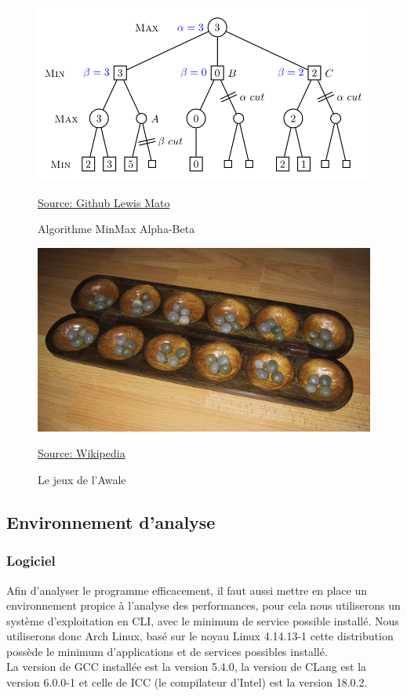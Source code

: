 \documentclass[
 aip,
 jmp,
 amsmath,amssymb,
 reprint
]{revtex4-1}
\begin{document}
\begin{figure}[H]
  \includegraphics[width=\linewidth, keepaspectratio=true]{alpha_beta.png}
  \centering
  \caption{Algorithme MinMax Alpha-Beta\label{Fig:alpha_beta}}{\href{https://github.com/LewisMatos/MiniMaxTicTacToe}{Source: Github Lewis Mato}}
\end{figure}
\begin{figure}[H]
  \includegraphics[width=\linewidth, keepaspectratio=true]{Awale.jpg}
  \centering
  \caption{Le jeux de l'Awale\label{Fig:awale}}{\href{https://fr.wikipedia.org/wiki/Awale}{Source: Wikipedia}}
\end{figure}

\subsection{Environnement d'analyse}
\subsubsection{Logiciel}
Afin d'analyser le programme efficacement, il faut aussi mettre en place un environnement propice à l'analyse des performances, pour cela nous utiliserons un système d'exploitation en CLI, avec le minimum de service possible installé. Nous utiliserons donc Arch Linux, basé sur le noyau Linux 4.14.13-1 cette distribution possède le minimum d'applications et de services possibles installé.\\
La version de GCC installée est la version 5.4.0, la version de CLang est la version 6.0.0-1 et celle de ICC (le compilateur d'Intel) est la version 18.0.2.
\end{document}
